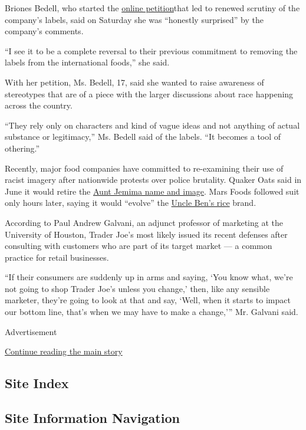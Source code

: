 Briones Bedell, who started the
\href{https://www.change.org/p/trader-joe-s-remove-racist-packaging-from-your-products}{online
petition}that led to renewed scrutiny of the company's labels, said on
Saturday she was ``honestly surprised'' by the company's comments.

``I see it to be a complete reversal to their previous commitment to
removing the labels from the international foods,'' she said.

With her petition, Ms. Bedell, 17, said she wanted to raise awareness of
stereotypes that are of a piece with the larger discussions about race
happening across the country.

``They rely only on characters and kind of vague ideas and not anything
of actual substance or legitimacy,'' Ms. Bedell said of the labels. ``It
becomes a tool of othering.''

Recently, major food companies have committed to re-examining their use
of racist imagery after nationwide protests over police brutality.
Quaker Oats said in June it would retire the
\href{https://www.nytimes3xbfgragh.onion/2020/06/17/business/media/aunt-jemima-racial-stereotype.html}{Aunt
Jemima name and image}. Mars Foods followed suit only hours later,
saying it would ``evolve'' the
\href{https://www.nytimes3xbfgragh.onion/2020/06/17/business/aunt-jemima-mrs-butterworth-uncle-ben.html}{Uncle
Ben's rice} brand.

According to Paul Andrew Galvani, an adjunct professor of marketing at
the University of Houston, Trader Joe's most likely issued its recent
defenses after consulting with customers who are part of its target
market --- a common practice for retail businesses.

``If their consumers are suddenly up in arms and saying, `You know what,
we're not going to shop Trader Joe's unless you change,' then, like any
sensible marketer, they're going to look at that and say, `Well, when it
starts to impact our bottom line, that's when we may have to make a
change,''' Mr. Galvani said.

Advertisement

\protect\hyperlink{after-bottom}{Continue reading the main story}

\hypertarget{site-index}{%
\subsection{Site Index}\label{site-index}}

\hypertarget{site-information-navigation}{%
\subsection{Site Information
Navigation}\label{site-information-navigation}}

